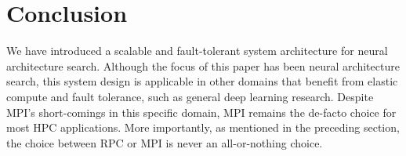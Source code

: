 \documentclass[conference]{IEEEtran}
\begin{document}
\section{Conclusion}
We have introduced a scalable and fault-tolerant system architecture for
neural architecture search. Although the focus of this paper has been
neural architecture search, this system design is applicable in other domains
that benefit from elastic compute and fault tolerance, such as general
deep learning research. Despite MPI's short-comings in this specific domain,
MPI remains the de-facto choice for most HPC applications. More importantly,
as mentioned in the preceding section, the choice between RPC or MPI is never
an all-or-nothing choice.
\balance


\end{document}
